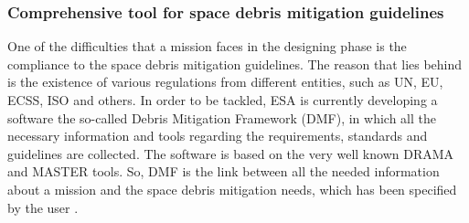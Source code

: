 
\bigskip
\subsubsection{Comprehensive tool for space debris mitigation guidelines}
\bigskip
One of the difficulties that a mission faces in the designing phase is the compliance to the space debris mitigation guidelines. The reason that lies behind is the existence of various regulations from different entities, such as UN, EU, ECSS, ISO and others. In order to be tackled, ESA is currently developing a software the so-called Debris Mitigation Framework (DMF), in which all the necessary information and tools regarding the requirements, standards and guidelines are collected. The software is based on the very well known DRAMA and MASTER tools. So, DMF is the link between all the needed information about a mission and the space debris mitigation needs, which has been specified by the user \cite{Braun}.

\bigskip
